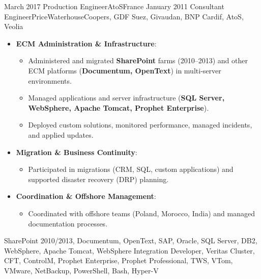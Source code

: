 \begin{experiences}
\emptySeparator
\emptySeparator

\consultantexperience
    {March 2017}       {Production Engineer}{AtoS}{France}
    {January 2011}    {Consultant Engineer}{PriceWaterhouseCoopers, GDF Suez, Givaudan, BNP Cardif, AtoS, Veolia} {
        \begin{itemize}[left=0pt,label={},itemsep=0.4em]

          \item \textbf{ECM Administration \& Infrastructure}:
            \begin{itemize}[itemsep=0.15em,topsep=0.1em,parsep=0pt]
              \small
              \item Administered and migrated \textbf{SharePoint} farms (2010–2013) and other ECM platforms (\textbf{Documentum, OpenText}) in multi-server environments.
              \item Managed applications and server infrastructure (\textbf{SQL Server, WebSphere, Apache Tomcat, Prophet Enterprise}).
              \item Deployed custom solutions, monitored performance, managed incidents, and applied updates.
            \end{itemize}

          \item \textbf{Migration \& Business Continuity}:
            \begin{itemize}[itemsep=0.15em,topsep=0.1em,parsep=0pt]
              \small
              \item Participated in migrations (CRM, SQL, custom applications) and supported disaster recovery (DRP) planning.
            \end{itemize}

          \item \textbf{Coordination \& Offshore Management}:
            \begin{itemize}[itemsep=0.15em,topsep=0.1em,parsep=0pt]
              \small
              \item Coordinated with offshore teams (Poland, Morocco, India) and managed documentation processes.
            \end{itemize}

        \end{itemize}
    }
    {SharePoint 2010/2013, Documentum, OpenText, SAP, Oracle, SQL Server, DB2, WebSphere, Apache Tomcat, WebSphere Integration Developer, Veritas Cluster, CFT, ControlM, Prophet Enterprise, Prophet Professional, TWS, VTom, VMware, NetBackup, PowerShell, Bash, Hyper-V}


\end{experiences}
